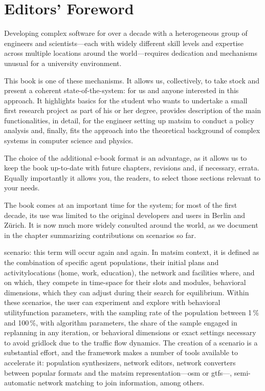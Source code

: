 \chapter*{Editors' Foreword}



Developing complex software for over a decade with a heterogeneous group of engineers and scientists---each with widely different skill levels and expertise across multiple locations around the world---requires dedication and mechanisms unusual for a university environment. 

This book is one of these mechanisms. It allows us, collectively, to take stock and present a coherent state-of-the-system: for us and anyone interested in this approach. It highlights  basics for the student who wants to undertake a small first research project as part of his or her degree, provides description of the main functionalities, in detail, for the engineer setting up \gls{matsim} to conduct a policy analysis and, finally, fits the approach into the theoretical background of complex systems in computer science and physics. 

The choice of the additional e-book format is an advantage, as it allows us to keep the book up-to-date with future chapters, revisions and, if necessary, errata. Equally importantly it allows you, the readers, to select those sections relevant to your needs. 

The book comes at an important time for the system; for most of the first decade, its use was limited to the original developers and users in Berlin and Zürich. It is now much more widely consulted around the world, as we document in the chapter summarizing contributions on \glspl{scenario} so far. 

\Gls{scenario}: this term will occur again and again. In \gls{matsim} context, it is defined as the combination of specific agent populations, their initial \glspl{plan} and \glspl{activitylocation} (home, work, education), the network and facilities where, and on which, they compete in time-space for their slots and modules, \ie behavioral dimensions, which they can adjust during their search for equilibrium. Within these \glspl{scenario}, the user can experiment and explore with behavioral \gls{utilityfunction} parameters, with the sampling rate of the population between 1\,\% and 100\,\%, with algorithm parameters, \eg the share of the sample engaged in \gls{replanning} in any \gls{iteration}, or behavioral dimensions or exact settings necessary to avoid gridlock due to the traffic flow dynamics.
The creation of a \gls{scenario} is a substantial effort, and the \gls{framework} makes a number of tools available to accelerate it: population synthesizers, network editors, network converters between popular formats and the \gls{matsim} representation---\eg \gls{osm} or \gls{gtfs}---, semi-automatic network matching to join information, among others.

